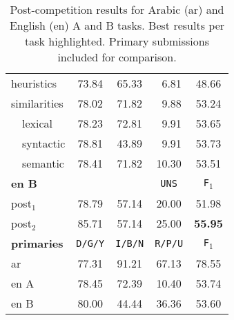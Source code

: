 \begin{table}[t]
\begin{tabular}{|l|cccc|}
 heuristics		& 73.84	& 65.33	& \,\,\,6.81	& 48.66\\
 similarities		& 78.02	& 71.82	& \,\,\,9.88	& 53.24	\\
 \,\,\,\, lexical	& 78.23	& 72.81	& \,\,\,9.91	& 53.65	\\
 \,\,\,\, syntactic	& 78.81	& 43.89	& \,\,\,9.91	& 53.73	 \\
 \,\,\,\, semantic	& 78.41	& 71.82	& 10.30		& 53.51	 \\   
  \hline
  \hline
  \bf en B	& \yes & \no	& \texttt{UNS}	& \texttt{F$_1$}\\ \hline
 post$_1$	& 78.79	& 57.14	& 20.00		& 51.98 \\
 post$_2$	& 85.71	& 57.14	& 25.00 	& \bf 55.95 \\
 \hline
 \hline  
 \bf primaries	& \texttt{D/G/Y}& \texttt{I/B/N}& \texttt{R/P/U} & 
\texttt{F$_1$}\\\hline
  ar		& 77.31		& 91.21		& 67.13	& 78.55 \\
  en A		& 78.45		& 72.39		& 10.40	& 53.74 \\
  en B 		& 80.00		& 44.44		& 36.36	& 53.60 \\
  \hline
 
 
 \end{tabular}
 \caption{Post-competition results for Arabic (ar) and English (en) A and B 
tasks. Best results per task highlighted. Primary submissions included for 
comparison.
\label{tab:aftertask}}
\end{table}








